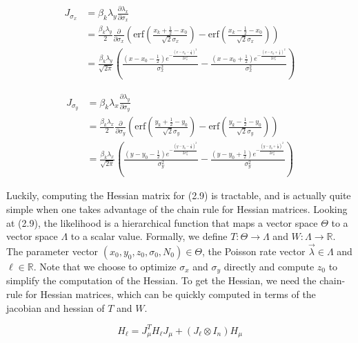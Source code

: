 \begin{align*}
J_{\sigma_{x}} &= \beta_{k}\lambda_{y}\frac{\partial \lambda_{x}}{\partial \sigma_{x}} \\
&= \frac{\beta_{k}\lambda_{y}}{2}\frac{\partial}{\partial \sigma_{x}}\left(\mathrm{erf}\left(\frac{x_{k}+\frac{1}{2}-x_{0}}{\sqrt{2}\sigma_{x}}\right) -\mathrm{erf}\left(\frac{x_{k}-\frac{1}{2}-x_{0}}{\sqrt{2}\sigma_{x}}\right)\right)\\
&= \frac{\beta_{k}\lambda_{y}}{\sqrt{2\pi}}\left(\frac{\left(x-x_{0}-\frac{1}{2}\right) e^{-\frac{\left(x-x_{0}-\frac{1}{2}\right)^2}{2 \sigma_{x} ^2}}}{\sigma_{x} ^2}-\frac{ \left(x-x_{0}+\frac{1}{2}\right) e^{-\frac{\left(x-x_{0}+\frac{1}{2}\right)^2}{2 \sigma_{x} ^2}}}{\sigma_{x} ^2}\right)
\end{align*}

\begin{align*}
J_{\sigma_{y}} &= \beta_{k}\lambda_{x}\frac{\partial \lambda_{y}}{\partial \sigma_{y}} \\
&= \frac{\beta_{k}\lambda_{x}}{2}\frac{\partial}{\partial \sigma_{y}}\left(\mathrm{erf}\left(\frac{y_{k}+\frac{1}{2}-y_{0}}{\sqrt{2}\sigma_{y}}\right) -\mathrm{erf}\left(\frac{y_{k}-\frac{1}{2}-y_{0}}{\sqrt{2}\sigma_{y}}\right)\right)\\
&= \frac{\beta_{k}\lambda_{x}}{\sqrt{2\pi}}\left(\frac{\left(y-y_{0}-\frac{1}{2}\right) e^{-\frac{\left(y-y_{0}-\frac{1}{2}\right)^2}{2 \sigma_{y} ^2}}}{\sigma_{y} ^2}-\frac{ \left(y-y_{0}+\frac{1}{2}\right) e^{-\frac{\left(y-y_{0}+\frac{1}{2}\right)^2}{2 \sigma_{y} ^2}}}{\sigma_{y} ^2}\right)
\end{align*}

Luckily, computing the Hessian matrix for (2.9) is tractable, and is actually quite simple when one takes advantage of the chain rule for Hessian matrices. Looking at (2.9), the likelihood is a hierarchical function that maps a vector space $\Theta$ to a vector space $\Lambda$ to a scalar value. Formally, we define $T: \Theta \rightarrow \Lambda$ and $W: \Lambda \rightarrow \mathbb{R}$. The parameter vector $(x_{0},y_{0},z_{0}, \sigma_{0}, N_{0})\in \Theta$, the Poisson rate vector $\vec{\lambda} \in \Lambda$ and $\ell \in \mathbb{R}$. Note that we choose to optimize $\sigma_{x}$ and $\sigma_{y}$ directly and compute $z_{0}$ to simplify the computation of the Hessian. To get the Hessian, we need the chain-rule for Hessian matrices, which can be quickly computed in terms of the jacobian and hessian of $T$ and $W$.


\begin{equation*}
H_{\ell} = J_{\mu}^{T} H_{\ell} J_{\mu} + (J_{\ell}\otimes I_{n})H_{\mu}
\end{equation*}


